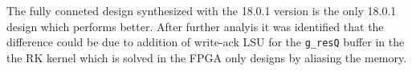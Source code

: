The fully conneted design synthesized with the 18.0.1 version is the only
18.0.1 design which performs better. After further analyis it was identified that
the difference could be due to addition of write-ack LSU for the \texttt{g\_resQ}
buffer in the the RK kernel which is solved in the FPGA only designs by aliasing
the memory.







